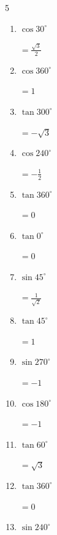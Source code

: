 \begin{multicols}{5}
\begin{enumerate}
        $\displaystyle =-\frac{\sqrt{3}}{2}$

  \item $\displaystyle \cos{30^\circ}$

        $\displaystyle =\frac{\sqrt{3}}{2}$

  \item $\displaystyle \cos{360^\circ}$

        $\displaystyle =1$

  \item $\displaystyle \tan{300^\circ}$

        $\displaystyle =-\sqrt{3}$

  \item $\displaystyle \cos{240^\circ}$

        $\displaystyle =-\frac{1}{2}$

  \item $\displaystyle \tan{360^\circ}$

        $\displaystyle =0$

  \item $\displaystyle \tan{0^\circ}$

        $\displaystyle =0$

  \item $\displaystyle \sin{45^\circ}$

        $\displaystyle =\frac{1}{\sqrt{2}}$

  \item $\displaystyle \tan{45^\circ}$

        $\displaystyle =1$

  \item $\displaystyle \sin{270^\circ}$

        $\displaystyle =-1$

  \item $\displaystyle \cos{180^\circ}$

        $\displaystyle =-1$

\columnbreak %

\resetques

  \item $\displaystyle \tan{60^\circ}$

        $\displaystyle =\sqrt{3}$

  \item $\displaystyle \tan{360^\circ}$

        $\displaystyle =0$

  \item $\displaystyle \sin{240^\circ}$


\end{enumerate}
\end{multicols}
